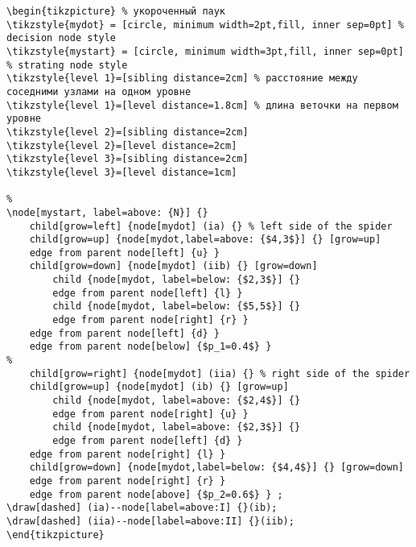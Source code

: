 \documentclass[12pt,a4paper]{article}
\begin{document}
\begin{verbatim}
\begin{tikzpicture} % укороченный паук
\tikzstyle{mydot} = [circle, minimum width=2pt,fill, inner sep=0pt] % decision node style
\tikzstyle{mystart} = [circle, minimum width=3pt,fill, inner sep=0pt] % strating node style
\tikzstyle{level 1}=[sibling distance=2cm] % расстояние между соседними узлами на одном уровне
\tikzstyle{level 1}=[level distance=1.8cm] % длина веточки на первом уровне
\tikzstyle{level 2}=[sibling distance=2cm]
\tikzstyle{level 2}=[level distance=2cm]
\tikzstyle{level 3}=[sibling distance=2cm]
\tikzstyle{level 3}=[level distance=1cm]

%
\node[mystart, label=above: {N}] {}
    child[grow=left] {node[mydot] (ia) {} % left side of the spider
    child[grow=up] {node[mydot,label=above: {$4,3$}] {} [grow=up]
    edge from parent node[left] {u} }
    child[grow=down] {node[mydot] (iib) {} [grow=down]
        child {node[mydot, label=below: {$2,3$}] {}
        edge from parent node[left] {l} }
        child {node[mydot, label=below: {$5,5$}] {}
        edge from parent node[right] {r} }
    edge from parent node[left] {d} }
    edge from parent node[below] {$p_1=0.4$} }
%
    child[grow=right] {node[mydot] (iia) {} % right side of the spider
    child[grow=up] {node[mydot] (ib) {} [grow=up]
        child {node[mydot, label=above: {$2,4$}] {}
        edge from parent node[right] {u} }
        child {node[mydot, label=above: {$2,3$}] {}
        edge from parent node[left] {d} }
    edge from parent node[right] {l} }
    child[grow=down] {node[mydot,label=below: {$4,4$}] {} [grow=down]
    edge from parent node[right] {r} }
    edge from parent node[above] {$p_2=0.6$} } ;
\draw[dashed] (ia)--node[label=above:I] {}(ib);
\draw[dashed] (iia)--node[label=above:II] {}(iib);
\end{tikzpicture}        
\end{verbatim}


\newpage
{}
\end{document}
